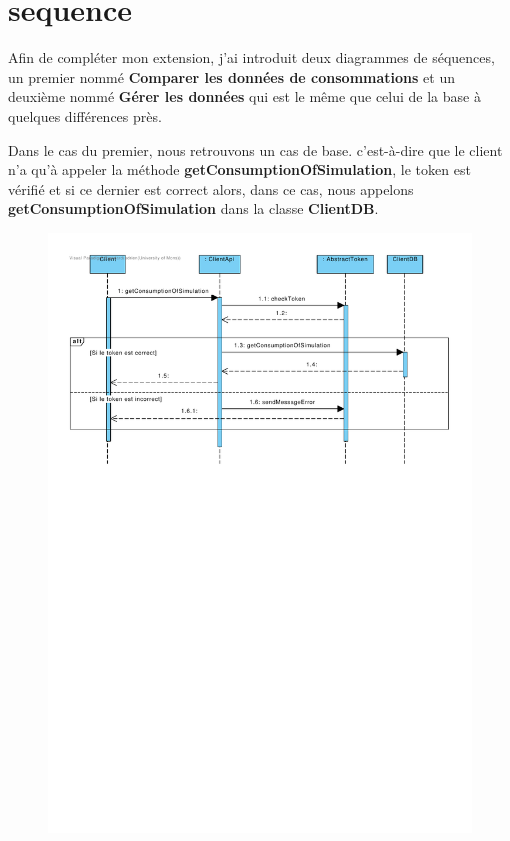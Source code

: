 \section{sequence}

\begin{flushleft}
Afin de compléter mon extension, j'ai introduit deux diagrammes de séquences, un premier nommé \textbf{Comparer les données de consommations} et un deuxième nommé \textbf{Gérer les données} qui est le même que celui de la base à quelques différences près.
\end{flushleft}

\begin{flushleft}
Dans le cas du premier, nous retrouvons un cas de base. c'est-à-dire que le client n'a qu'à appeler la méthode \textbf{getConsumptionOfSimulation}, le token est vérifié et si ce dernier est correct alors, dans ce cas, nous appelons \textbf{getConsumptionOfSimulation} dans la classe \textbf{ClientDB}.
\end{flushleft}

\begin{figure}[h]
\centering
\includegraphics[width=1.3\textwidth]{extension-adrien/Sequence/img/Comparer.pdf}
\end{figure}


